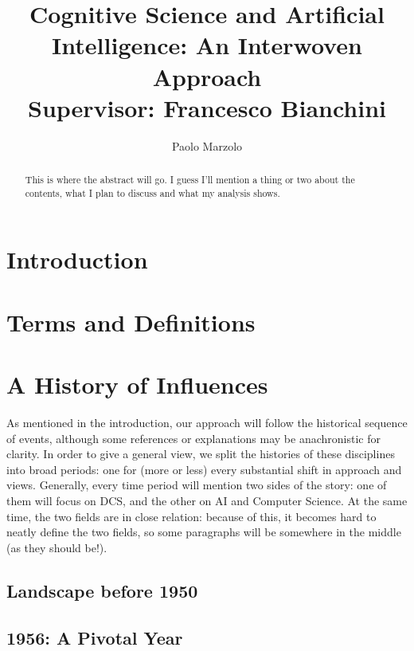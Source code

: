 \documentclass[oneside,notitlepage]{report}
\title{Cognitive Science and Artificial Intelligence: An Interwoven Approach \\
\large Supervisor: Francesco Bianchini}
\author{Paolo Marzolo}
\begin{document}
\begin{titlingpage}
    \maketitle
    \begin{abstract}
        This is where the abstract will go. I guess I'll mention a thing or two about the contents, what I plan to discuss and what my analysis shows.
    \end{abstract}
\end{titlingpage}

\tableofcontents
\newpage

\chapter{Introduction}


\chapter{Terms and Definitions}


\chapter{A History of Influences}
As mentioned in the introduction, our approach will follow the historical sequence of events, although some references or explanations may be anachronistic for clarity. In order to give a general view, we split the histories of these disciplines into broad periods: one for (more or less) every substantial shift in approach and views. Generally, every time period will mention two sides of the story: one of them will focus on DCS, and the other on AI and Computer Science. At the same time, the two fields are in close relation: because of this, it becomes hard to neatly define the two fields, so some paragraphs will be somewhere in the middle (as they should be!).

\section{Landscape before 1950}


\section{1956: A Pivotal Year}

\end{document}
